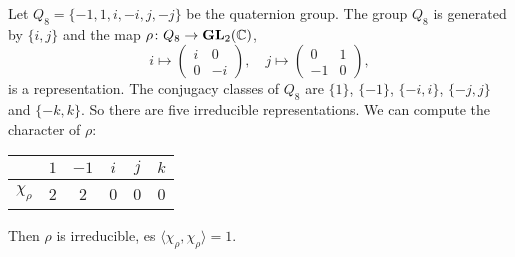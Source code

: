\begin{example}



\end{example}

\begin{example}
    Let $Q_8=\{-1,1,i,-i,j,-j\}$ be the quaternion group. 
    The group $Q_8$ is generated by $\{i,j\}$ and the map $\rho\colon Q_8\to\mathbf{GL}_2(\mathbb{C})$, 
    \[
    i\mapsto\begin{pmatrix}
    i&0\\0&-i
    \end{pmatrix},
    \quad
    j\mapsto\begin{pmatrix}
    0&1\\-1&0
    \end{pmatrix},
    \]
    is a representation.
    The conjugacy classes of $Q_8$ are $\{1\}$, $\{-1\}$, $\{-i,i\}$, $\{-j,j\}$ and $\{-k,k\}$. 
    So there are five irreducible representations. 
    We can compute the character of $\rho$:
    	\begin{center}
		\begin{tabular}{|c|c|c|c|c|c|}
		    \hline
			& $1$ & $-1$ & $i$ & $j$ & $k$\tabularnewline
			\hline
			$\chi_\rho$ & 2 & 2 & 0 & 0 & 0\tabularnewline
			\hline
		\end{tabular}
	\end{center}
	Then $\rho$ is irreducible, es $\langle\chi_\rho,\chi_\rho\rangle=1$. 
	

\end{example}
